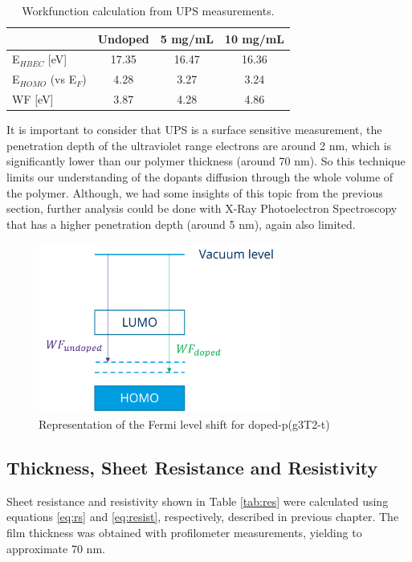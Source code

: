 \begin{table}[ht]
\centering
\caption{Workfunction calculation from UPS measurements.}
\begin{tabular}{l|c|c|c}
& Undoped & 5 mg/mL & 10 mg/mL \\\hline
E$_{HBEC}$ [eV] & 17.35 & 16.47 & 16.36\\
E$_{HOMO}$ (vs E$_{F}$) & 4.28 & 3.27 & 3.24\\
WF [eV] & 3.87 & 4.28 & 4.86\\\hline
\end{tabular}
\label{tab:ups}
\end{table}

It is important to consider that UPS is a surface sensitive measurement, the penetration depth of the ultraviolet range electrons are around 2 nm, which is significantly lower than our polymer thickness (around 70 nm). So this technique limits our understanding of the dopants diffusion through the whole volume of the polymer. Although, we had some insights of this topic from the previous section, further analysis could be done with X-Ray Photoelectron Spectroscopy that has a higher penetration depth (around 5 nm), again also limited. %

\begin{figure}[ht]
  \centering
  \includegraphics[width=8cm]{Images/pdf/WF.pdf}
  \caption[Representation of the Fermi level shift upon doping]{Representation of the Fermi level shift for doped-p(g3T2-t)}
  \label{fig:ups}
\end{figure}

\subsection{Thickness, Sheet Resistance and Resistivity}

Sheet resistance and resistivity shown in Table \ref{tab:res} were calculated using equations \ref{eq:rs} and \ref{eq:resist}, respectively, described in previous chapter. The film thickness was obtained with profilometer measurements, yielding to approximate 70 nm.

